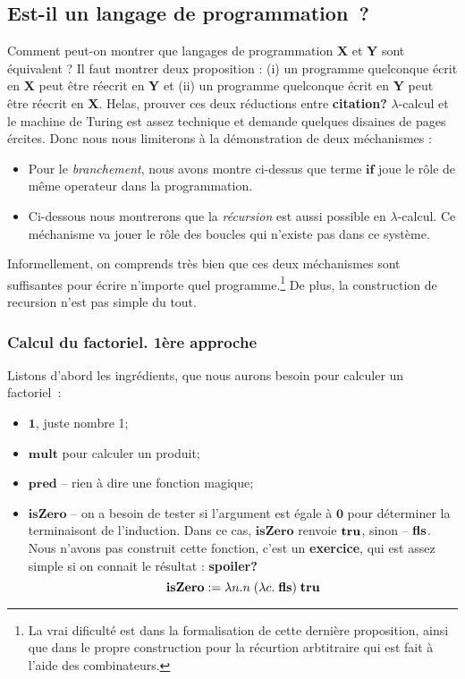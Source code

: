\subsection*{Est-il un langage de programmation~?}

Comment peut-on montrer que langages de programmation \textbf{X} et \textbf{Y} sont équivalent ?
Il faut montrer deux proposition : (i) un programme quelconque écrit en \textbf{X} peut être réecrit en \textbf{Y} et (ii) un programme quelconque écrit en \textbf{Y} peut être réecrit en \textbf{X}.
Helas, prouver ces deux réductions entre \textbf{citation?} $\lambda$-calcul et le machine de Turing est assez technique et demande quelques disaines de pages ércites.
Donc nous nous limiterons à la démonstration de deux méchanismes :
\begin{itemize}
	\item Pour le \emph{branchement}, nous avons montre ci-dessus que terme $\mathbf{if}$ joue le rôle de même operateur dans la programmation.
	\item Ci-dessous nous montrerons que la \emph{récursion} est aussi possible en $\lambda$-calcul. Ce méchanisme va jouer le rôle des boucles qui n'existe pas dans ce système.
\end{itemize}
Informellement, on comprends très bien que ces deux méchanismes sont suffisantes pour écrire n'importe quel programme.\footnote{La vrai dificulté est dans la formalisation de cette dernière proposition, ainsi que dans le propre construction pour la récurtion arbtitraire qui est fait à l'aide des combinateurs.}
De plus, la construction de recursion n'est pas simple du tout.

\subsubsection*{Calcul du factoriel. 1ère approche}
Listons d'abord les ingrédients, que nous aurons besoin pour calculer un factoriel~:
\begin{itemize}
	\item $\mathbf{1}$, juste nombre 1;
	\item $\mathbf{mult}$ pour calculer un produit;
	\item $\mathbf{pred}$ -- rien à dire une fonction magique;
	\item $\mathbf{isZero}$ -- on a besoin de tester si l'argument est égale à $\mathbf{0}$ pour déterminer la terminaisont de l'induction. Dans ce cas, $\mathbf{isZero}$ renvoie $\mathbf{tru}$, sinon -- $\mathbf{fls}$.
	Nous n'avons pas construit cette fonction, c'est un \textbf{exercice}, qui est assez simple si on connait le résultat : \textbf{spoiler?} $$\mathbf{isZero} := \lambda n. n \; (\lambda c. \; \mathbf{fls}) \; \mathbf{tru}$$
\end{itemize}

